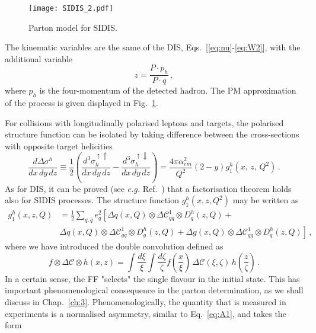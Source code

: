 \begin{figure}
  \centering
  \texttt{[image: SIDIS\_2.pdf]} 
  \caption{Parton model for SIDIS.}
  \label{fig:SIDIS_PM}
\end{figure}
The kinematic variables are the same of the DIS, Eqs.~[\ref{eq:nu}-\ref{eq:W2}], with the additional variable
\begin{equation}
  z = \frac{P \cdot p_h}{P \cdot q} \,,
\end{equation}
where $p_h$ is the four-momentum of the detected hadron. The PM approximation of the process is given displayed in Fig.~\ref{fig:SIDIS_PM}.\par
For collisions with longitudinally polarised leptons and targets, the polarised structure function can be isolated by taking difference between the cross-sections with opposite target helicities \cite{Abele:2021nyo}
\begin{equation}
  \frac{d \Delta \sigma^h}{dx \, dy \, dz} \equiv  \frac{1}{2} \left(\frac{d^3\sigma_{h}^{\uparrow \Uparrow}}{dx\,dy\,dz} - \frac{d^3\sigma_{h}^{\uparrow \Downarrow}}{dx\,dy\,dz}\right) = \frac{4\pi \alpha_{em}^2}{Q^2} (2-y) g_{1}^{h} (x,\,z,\,Q^2)\,.
\end{equation}
As for DIS, it can be proved (see \textit{e.g.} Ref.~\cite{collins_2011}) that a factorisation theorem holds also for SIDIS processes. The structure function $g_1^h (x,z,Q^2)$ may be written as
\begin{equation}
  \begin{split}
    g_1^{h} (x,z,Q) & = \frac{1}{2} \sum_{q,\bar{q}} e_{q}^2 \left[ \Delta q(x,Q) \otimes \Delta \mathcal{C}_{qq}^{1} \otimes D_{q}^{h}(z,Q) + \right.\\
    & \left.\Delta q(x,Q) \otimes \Delta \mathcal{C}_{gq}^{1} \otimes D^{h}_{g}(z,Q) + \Delta g(x,Q) \otimes \Delta \mathcal{C}_{qg}^{1} \otimes D^{h}_{q}(z,Q) \right] \,,
    \end{split}
    \label{eq:g1h}
\end{equation}
where we have introduced the double convolution defined as 
\begin{equation}
  f \otimes \Delta \mathcal{C} \otimes h (x,z) = \int \frac{d\xi}{\xi} \int \frac{d \zeta} {\zeta} f \left( \frac{x}{\xi}\right)  \, \Delta \mathcal{C} \left(\xi, \zeta\right) \, h \left( \frac{z}{\zeta} \right) \,.
\end{equation}
In a certain sense, the FF "selects" the single flavour in the initial state. This has important phenomenological consequence in the parton determination, as we shall discuss in Chap.~\ref*{ch:3}. Phenomenologically, the quantity that is measured in experiments is a normalised asymmetry, similar to Eq.~\eqref{eq:A1}, and takes the form \cite{deFlorian:2000bm}
